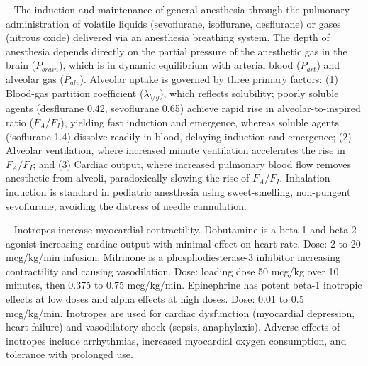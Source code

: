 -- The induction and maintenance of general anesthesia through the pulmonary administration of volatile liquids (sevoflurane, isoflurane, desflurane) or gases (nitrous oxide) delivered via an anesthesia breathing system. The depth of anesthesia depends directly on the partial pressure of the anesthetic gas in the brain ($P_{brain}$), which is in dynamic equilibrium with arterial blood ($P_{art}$) and alveolar gas ($P_{alv}$). Alveolar uptake is governed by three primary factors: (1) Blood-gas partition coefficient ($\lambda_{b/g}$), which reflects solubility; poorly soluble agents (desflurane 0.42, sevoflurane 0.65) achieve rapid rise in alveolar-to-inspired ratio ($F_A/F_I$), yielding fast induction and emergence, whereas soluble agents (isoflurane 1.4) dissolve readily in blood, delaying induction and emergence; (2) Alveolar ventilation, where increased minute ventilation accelerates the rise in $F_A/F_I$; and (3) Cardiac output, where increased pulmonary blood flow removes anesthetic from alveoli, paradoxically slowing the rise of $F_A/F_I$. Inhalation induction is standard in pediatric anesthesia using sweet-smelling, non-pungent sevoflurane, avoiding the distress of needle cannulation.

-- Inotropes increase myocardial contractility. Dobutamine is a beta-1 and beta-2 agonist increasing cardiac output with minimal effect on heart rate. Dose: 2 to 20 mcg/kg/min infusion. Milrinone is a phosphodiesterase-3 inhibitor increasing contractility and causing vasodilation. Dose: loading dose 50 mcg/kg over 10 minutes, then 0.375 to 0.75 mcg/kg/min. Epinephrine has potent beta-1 inotropic effects at low doses and alpha effects at high doses. Dose: 0.01 to 0.5 mcg/kg/min. Inotropes are used for cardiac dysfunction (myocardial depression, heart failure) and vasodilatory shock (sepsis, anaphylaxis). Adverse effects of inotropes include arrhythmias, increased myocardial oxygen consumption, and tolerance with prolonged use.

